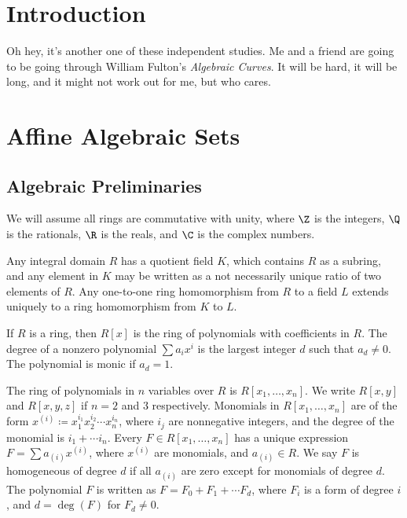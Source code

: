 \documentclass[10pt]{mypackage}
\begin{document}
\RaggedRight
\section{Introduction}%
Oh hey, it's another one of these independent studies. Me and a friend are going to be going through William Fulton's \textit{Algebraic Curves}. It will be hard, it will be long, and it might not work out for me, but who cares.
\tableofcontents
\section{Affine Algebraic Sets}%
\subsection{Algebraic Preliminaries}%
We will assume all rings are commutative with unity, where $\Z$ is the integers, $\Q$ is the rationals, $\R$ is the reals, and $\C$ is the complex numbers.\newline

Any integral domain $R$ has a quotient field $K$, which contains $R$ as a subring, and any element in $K$ may be written as a not necessarily unique ratio of two elements of $R$. Any one-to-one ring homomorphism from $R$ to a field $L$ extends uniquely to a ring homomorphism from $K$ to $L$.\newline

If $R$ is a ring, then $R[x]$ is the ring of polynomials with coefficients in $R$. The degree of a nonzero polynomial $\sum a_ix^i$ is the largest integer $d$ such that $a_d\neq 0$. The polynomial is monic if $a_d = 1$.\newline

The ring of polynomials in $n$ variables over $R$ is $R\left[x_1,\dots,x_n\right]$. We write $R\left[x,y\right]$ and $R\left[x,y,z\right]$ if $n=2$ and $3$ respectively. Monomials in $R\left[x_1,\dots,x_n\right]$ are of the form $x^{(i)} \coloneq x_1^{i_1}x_2^{i_2}\cdots x_n^{i_n}$, where $i_j$ are nonnegative integers, and the degree of the monomial is $i_1 + \cdots i_n$. Every $F\in R\left[x_1,\dots,x_n\right]$ has a unique expression $F = \sum a_{(i)}x^{(i)}$, where $x^{(i)}$ are monomials, and $a_{(i)}\in R$. We say $F$ is homogeneous of degree $d$ if all $a_{(i)}$ are zero except for monomials of degree $d$. The polynomial $F$ is written as $F = F_0 + F_1 + \cdots F_d$, where $F_i$ is a form of degree $i$, and $d = \deg(F)$ for $F_d\neq 0$.\newline
\end{document}
